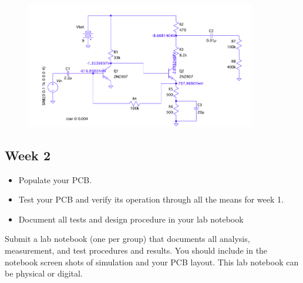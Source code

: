 \documentclass[12pt,letterpaper,onecolumn]{report}
\begin{document}
\begin{center}
\begin{figure}[!h]
\includegraphics[width=0.9\textwidth]{Figures/fuzzface.png}
\end{figure}
\end{center}
\subsection*{Week 2}
\begin{itemize}
\item Populate your PCB.
\item Test your PCB and verify its operation through all the means for week 1.
\item Document all tests and design procedure in your lab notebook
\end{itemize}





\noindent  Submit a lab notebook (one per group) that documents all analysis, measurement, and test procedures and results.  You should include in the notebook screen shots of simulation and your PCB layout.  This lab notebook can be physical or digital.
\end{document}
